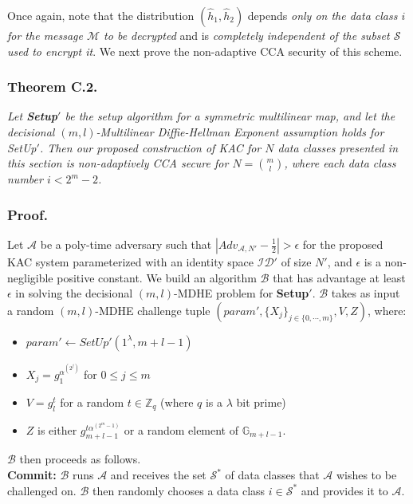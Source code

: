 Once again, note that the distribution $(\hat{h}_1,\hat{h}_2)$ depends \emph{only on the data class $i$ for the message $\mathcal{M}$ to be decrypted} and is \emph{completely independent of the subset $\mathcal{S}$ used to encrypt it}. We next prove the non-adaptive CCA security of this scheme. 

\subsubsection{Theorem C.2.} \textit{Let \textbf{Setup}$'$ be the setup algorithm for a symmetric multilinear map, and let the decisional $(m,l)$-Multilinear Diffie-Hellman Exponent assumption holds for {SetUp}$'$. Then our proposed construction of KAC for $N$ data classes presented in this section is non-adaptively CCA secure for $N=\binom{m}{l}$, where each data class number $i<2^m-2$.}

\subsubsection{Proof.} Let $\mathcal{A}$ be a poly-time adversary such that $|Adv_{\mathcal{A},N'}-\frac{1}{2}| > \epsilon$ for the proposed KAC system parameterized with an identity space $\mathcal{ID}'$ of size $N'$, and $\epsilon$ is a non-negligible positive constant. We build an algorithm $\mathcal{B}$ that has advantage at least $\epsilon$ in solving the decisional $(m,l)$-MDHE problem for \textbf{Setup}$'$. $\mathcal{B}$ takes as input a random $(m,l)$-MDHE challenge tuple $(param',\{X_j\}_{j\in\{0,\cdots,m\}},V,Z)$, where:
\begin{itemize}
 \item $param'\leftarrow SetUp'(1^{\lambda},m+l-1)$
 \item $X_j=g^{\alpha^{(2^j)}}_{1}$ for $0\leq j \leq m$
 \item $V=g^{t}_{l}$ for a random $t\in\mathbb{Z}_q$ (where $q$ is a $\lambda$ bit prime)
 \item $Z$ is either $g^{t\alpha^{(2^m-1)}}_{m+l-1}$ or a random element of $\mathbb{G}_{m+l-1}$.
\end{itemize}
\noindent $\mathcal{B}$ then proceeds as follows.\\

\noindent \textbf{Commit:} $\mathcal{B}$ runs $\mathcal{A}$ and receives the set ${\mathcal{S}}^{*}$ of data classes that $\mathcal{A}$ wishes to be challenged on. $\mathcal{B}$ then randomly chooses a data class $i\in{\mathcal{S}}^{*}$ and provides it to $\mathcal{A}$.\\
 

